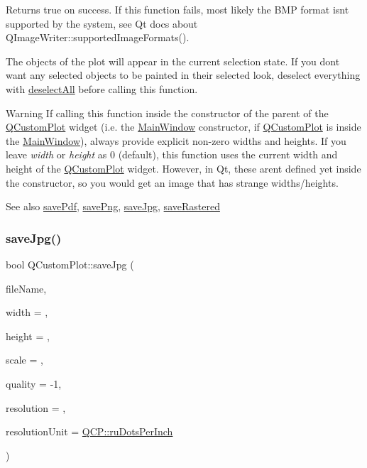 Returns true on success. If this function fails, most likely the B\+MP format isn\textquotesingle{}t supported by the system, see Qt docs about Q\+Image\+Writer\+::supported\+Image\+Formats().

The objects of the plot will appear in the current selection state. If you don\textquotesingle{}t want any selected objects to be painted in their selected look, deselect everything with \hyperlink{classQCustomPlot_a9d4808ab925b003054085246c92a257c}{deselect\+All} before calling this function.

\begin{DoxyWarning}{Warning}
If calling this function inside the constructor of the parent of the \hyperlink{classQCustomPlot}{Q\+Custom\+Plot} widget (i.\+e. the \hyperlink{classMainWindow}{Main\+Window} constructor, if \hyperlink{classQCustomPlot}{Q\+Custom\+Plot} is inside the \hyperlink{classMainWindow}{Main\+Window}), always provide explicit non-\/zero widths and heights. If you leave {\itshape width} or {\itshape height} as 0 (default), this function uses the current width and height of the \hyperlink{classQCustomPlot}{Q\+Custom\+Plot} widget. However, in Qt, these aren\textquotesingle{}t defined yet inside the constructor, so you would get an image that has strange widths/heights.
\end{DoxyWarning}
\begin{DoxySeeAlso}{See also}
\hyperlink{classQCustomPlot_ad5acd34f6b39c3516887d7e54fec2412}{save\+Pdf}, \hyperlink{classQCustomPlot_ac92cc9256d12f354b40a4be4600b5fb9}{save\+Png}, \hyperlink{classQCustomPlot_a76f0d278e630a711fa6f48048cfd83e4}{save\+Jpg}, \hyperlink{classQCustomPlot_ad7723ce2edfa270632ef42b03a444352}{save\+Rastered} 
\end{DoxySeeAlso}
\mbox{\label{classQCustomPlot_a76f0d278e630a711fa6f48048cfd83e4}} 
\subsubsection{\texorpdfstring{save\+Jpg()}{saveJpg()}}
{\footnotesize\ttfamily bool Q\+Custom\+Plot\+::save\+Jpg (\begin{DoxyParamCaption}\item[{const Q\+String \&}]{file\+Name,  }\item[{int}]{width = {},  }\item[{int}]{height = {},  }\item[{double}]{scale = {},  }\item[{int}]{quality = {\ttfamily -\/1},  }\item[{int}]{resolution = {},  }\item[{\hyperlink{namespaceQCP_a715d46153da230990aa887d0f0602452}{Q\+C\+P\+::\+Resolution\+Unit}}]{resolution\+Unit = {\ttfamily \hyperlink{namespaceQCP_a715d46153da230990aa887d0f0602452affb887d8efe79c39a1aca2acd7002afc}{Q\+C\+P\+::ru\+Dots\+Per\+Inch}} }\end{DoxyParamCaption})}


